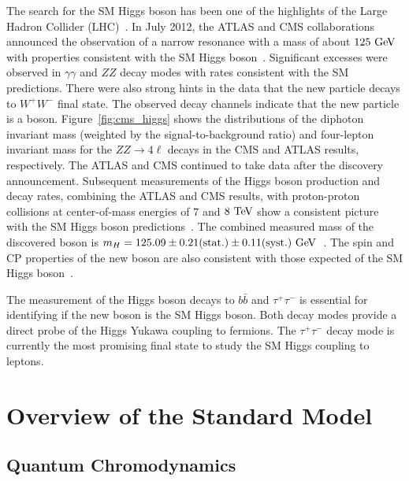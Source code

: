 The search for the SM Higgs boson has been one of the highlights of the Large Hadron Collider (LHC)~\cite{1748-0221-3-08-S08001}. In July 2012, the ATLAS and CMS collaborations announced the observation of a narrow resonance with a mass of about $125~\mathrm{Ge\kern -0.1em V}$ with properties consistent with the SM Higgs boson~\cite{Aad:2012tfa,Chatrchyan:2012xdj}. Significant excesses were observed in $\gamma\gamma$ and $ZZ$ decay modes with rates consistent with the SM predictions. There were also strong hints in the data that the new particle decays to $W^+W^-$ final state. The observed decay channels indicate that the new particle is a boson. Figure~\ref{fig:cms_higgs} shows the distributions of the diphoton invariant mass (weighted by the signal-to-background ratio) and four-lepton invariant mass for the $ZZ \rightarrow 4\ell$ decays in the CMS and ATLAS results, respectively. The ATLAS and CMS continued to take data after the discovery announcement. Subsequent measurements of the Higgs boson production and decay rates, combining the ATLAS and CMS results, with proton-proton collisions at center-of-mass energies of $7$ and $8~\mathrm{Te\kern -0.1em V}$ show a consistent picture with the SM Higgs boson predictions~\cite{Khachatryan:2016vau}. The combined measured mass of the discovered boson is $m_{H}=125.09 \pm 0.21 \mathrm{(stat.)} \pm 0.11 \mathrm{(syst.)}~\mathrm{Ge\kern -0.1em V}$~\cite{Aad:2015zhl}. The spin and CP properties of the new boson are also consistent with those expected of the SM Higgs boson~\cite{Chatrchyan:2012jja,Aad:2013xqa,Khachatryan:2014kca}.

The measurement of the Higgs boson decays to $b\bar{b}$ and $\tau^{+}\tau^{-}$ is essential for identifying if the new boson is the SM Higgs boson. Both decay modes provide a direct probe of the Higgs Yukawa coupling to fermions. The $\tau^{+}\tau^{-}$ decay mode is currently the most promising final state to study the SM Higgs coupling to leptons.

\section{Overview of the Standard Model}

\subsection{Quantum Chromodynamics}

